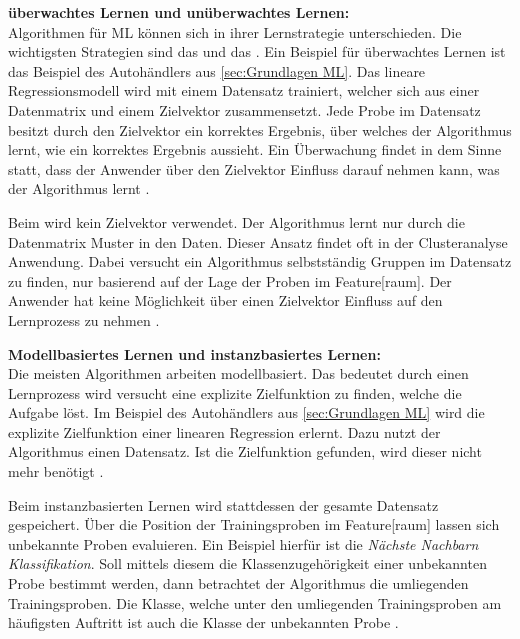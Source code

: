 \textbf{\Gls{überwachtes Lernen} und \gls{unüberwachtes Lernen}:}\\
Algorithmen für \gls{ML} können sich in ihrer Lernstrategie unterschieden. Die wichtigsten Strategien sind das  und das . Ein Beispiel für \gls{überwachtes Lernen} ist das Beispiel des Autohändlers aus \ref{sec:Grundlagen ML}. Das lineare Regressionsmodell wird mit einem Datensatz trainiert, welcher sich aus einer \gls{Datenmatrix} und einem \gls{Zielvektor} zusammensetzt. Jede Probe im Datensatz besitzt durch den \gls{Zielvektor} ein korrektes Ergebnis, über welches der Algorithmus lernt, wie ein korrektes Ergebnis aussieht. Ein Überwachung findet in dem Sinne statt, dass der Anwender über den \gls{Zielvektor} Einfluss darauf nehmen kann, was der Algorithmus lernt \cite{Burkov.2019, Goodfellow.2016}.\par

Beim  wird kein \gls{Zielvektor} verwendet. Der Algorithmus lernt nur durch die \gls{Datenmatrix} Muster in den Daten. Dieser Ansatz findet oft in der Clusteranalyse Anwendung. Dabei versucht ein Algorithmus selbstständig Gruppen im Datensatz zu finden, nur basierend auf der Lage der Proben im \gls{Feature}[raum]. Der Anwender hat keine Möglichkeit über einen \gls{Zielvektor} Einfluss auf den Lernprozess zu nehmen \cite{Burkov.2019, Goodfellow.2016}. \dubpar

\textbf{Modellbasiertes Lernen und instanzbasiertes Lernen:}\\
Die meisten Algorithmen arbeiten modellbasiert. Das bedeutet durch einen Lernprozess wird versucht eine explizite \gls{Zielfunktion} zu finden, welche die Aufgabe löst. Im Beispiel des Autohändlers aus \ref{sec:Grundlagen ML} wird die explizite \gls{Zielfunktion} einer linearen Regression erlernt. Dazu nutzt der Algorithmus einen Datensatz. Ist die \gls{Zielfunktion} gefunden, wird dieser nicht mehr benötigt \cite{Burkov.2019}.\par

Beim instanzbasierten Lernen wird stattdessen der gesamte Datensatz gespeichert. Über die Position der Trainingsproben im \gls{Feature}[raum] lassen sich unbekannte Proben evaluieren. Ein Beispiel hierfür ist die \textit{Nächste Nachbarn Klassifikation}. Soll mittels diesem  die Klassenzugehörigkeit einer unbekannten Probe bestimmt werden, dann betrachtet der Algorithmus die umliegenden Trainingsproben. Die Klasse, welche unter den umliegenden  Trainingsproben am häufigsten Auftritt ist auch die Klasse der unbekannten Probe \cite{Burkov.2019, Mitchell.1997}.\dubpar

